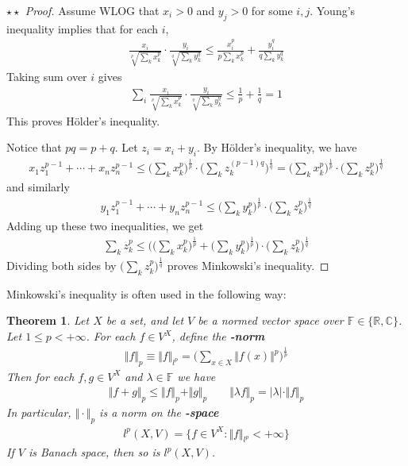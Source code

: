 \documentclass[12pt,b5paper,notitlepage]{article}
\theoremstyle{definition}
\theoremstyle{plain}
\newtheorem{thm}[df]{Theorem}
\newcommand{\Cbb}{\mathbb C}
\newcommand{\Rbb}{\mathbb R}
\newcommand{\Fbb}{\mathbb F}
\numberwithin{equation}{section}
\begin{document}
\begin{proof}[$\star\star$ Proof]
Assume WLOG that $x_i>0$ and $y_j>0$ for some $i,j$. Young's inequality implies that for each $i$,
\begin{align*}
\frac{x_i}{\sqrt[p]{\sum_k x_k^p}}\cdot \frac{y_i}{\sqrt[q]{\sum_k y_k^q}}\leq \frac{x_i^p}{p\sum_k x_k^p}+\frac{y_i^q}{q\sum_k y_k^q}
\end{align*}
Taking sum over $i$ gives
\begin{align*}
\sum_i\frac{x_i}{\sqrt[p]{\sum_k x_k^p}}\cdot \frac{y_i}{\sqrt[q]{\sum_k y_k^q}}\leq\frac 1p+\frac 1q=1
\end{align*}
This proves H\"older's inequality.

Notice that $pq=p+q$. Let $z_i=x_i+y_i$. By H\"older's inequality, we have
\begin{align*}
x_1z_1^{p-1}+\cdots+x_nz_n^{p-1}\leq \Big(\sum_k x_k^p\Big)^{\frac 1p}\cdot\Big(\sum_k z_k^{(p-1)q}\Big)^{\frac 1q}=\Big(\sum_k x_k^p\Big)^{\frac 1p}\cdot\Big(\sum_k z_k^p\Big)^{\frac 1q}
\end{align*}
and similarly
\begin{align*}
y_1z_1^{p-1}+\cdots+y_nz_n^{p-1}\leq\Big(\sum_k y_k^p\Big)^{\frac 1p}\cdot\Big(\sum_k z_k^p\Big)^{\frac 1q}
\end{align*}
Adding up these two inequalities, we get
\begin{align*}
\sum_k z_k^p\leq \bigg(\Big(\sum_k x_k^p\Big)^{\frac 1p}+\Big(\sum_k y_k^p\Big)^{\frac 1p}\bigg)\cdot\Big(\sum_k z_k^p\Big)^{\frac 1q}
\end{align*}
Dividing both sides by $\Big(\sum_k z_k^p\Big)^{\frac 1q}$ proves Minkowski's inequality.
\end{proof}



Minkowski's inequality is often used in the following way:


\begin{thm}
Let $X$ be a set, and let $V$ be a normed vector space over $\Fbb\in\{\Rbb,\Cbb\}$. Let $1\leq p<+\infty$. For each $f\in V^X$, define the \textbf{-norm} 
\begin{align}
\Vert f\Vert_p\equiv\Vert f\Vert_{l^p}=\Big(\sum_{x\in X}\Vert f(x)\Vert^p\Big)^{\frac 1p}
\end{align}
Then for each $f,g\in V^X$ and $\lambda\in\Fbb$ we have
\begin{align}\label{eq148}
\Vert f+g\Vert_p\leq \Vert f\Vert_p+\Vert g\Vert_p\qquad \Vert \lambda f\Vert_p =|\lambda|\cdot \Vert f\Vert_p
\end{align}
In particular, $\Vert\cdot\Vert_p$ is a norm on the \textbf{-space}
\begin{align}
l^p(X,V)=\{f\in V^X:\Vert f\Vert_{l^p}<+\infty\}
\end{align}
If $V$ is Banach space, then so is $l^p(X,V)$.
\end{thm}
\end{document}
